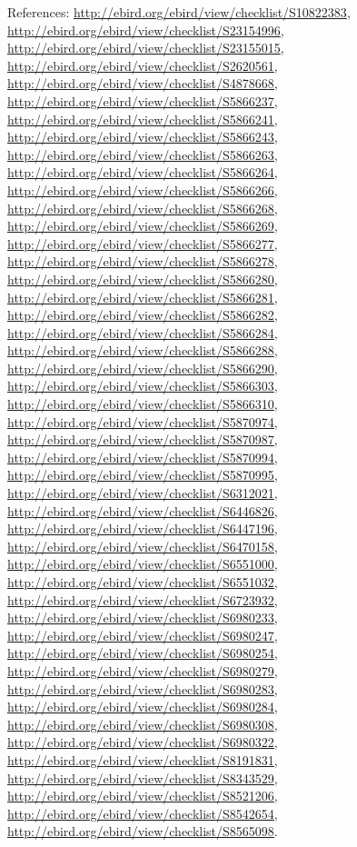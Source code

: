 \documentclass[9pt, article]{memoir}
\begin{document}
\begin{multicols}{2}
\vspace{6pt}References: 
\url{http://ebird.org/ebird/view/checklist/S10822383}, 
\url{http://ebird.org/ebird/view/checklist/S23154996}, 
\url{http://ebird.org/ebird/view/checklist/S23155015}, 
\url{http://ebird.org/ebird/view/checklist/S2620561}, 
\url{http://ebird.org/ebird/view/checklist/S4878668}, 
\url{http://ebird.org/ebird/view/checklist/S5866237}, 
\url{http://ebird.org/ebird/view/checklist/S5866241}, 
\url{http://ebird.org/ebird/view/checklist/S5866243}, 
\url{http://ebird.org/ebird/view/checklist/S5866263}, 
\url{http://ebird.org/ebird/view/checklist/S5866264}, 
\url{http://ebird.org/ebird/view/checklist/S5866266}, 
\url{http://ebird.org/ebird/view/checklist/S5866268}, 
\url{http://ebird.org/ebird/view/checklist/S5866269}, 
\url{http://ebird.org/ebird/view/checklist/S5866277}, 
\url{http://ebird.org/ebird/view/checklist/S5866278}, 
\url{http://ebird.org/ebird/view/checklist/S5866280}, 
\url{http://ebird.org/ebird/view/checklist/S5866281}, 
\url{http://ebird.org/ebird/view/checklist/S5866282}, 
\url{http://ebird.org/ebird/view/checklist/S5866284}, 
\url{http://ebird.org/ebird/view/checklist/S5866288}, 
\url{http://ebird.org/ebird/view/checklist/S5866290}, 
\url{http://ebird.org/ebird/view/checklist/S5866303}, 
\url{http://ebird.org/ebird/view/checklist/S5866310}, 
\url{http://ebird.org/ebird/view/checklist/S5870974}, 
\url{http://ebird.org/ebird/view/checklist/S5870987}, 
\url{http://ebird.org/ebird/view/checklist/S5870994}, 
\url{http://ebird.org/ebird/view/checklist/S5870995}, 
\url{http://ebird.org/ebird/view/checklist/S6312021}, 
\url{http://ebird.org/ebird/view/checklist/S6446826}, 
\url{http://ebird.org/ebird/view/checklist/S6447196}, 
\url{http://ebird.org/ebird/view/checklist/S6470158}, 
\url{http://ebird.org/ebird/view/checklist/S6551000}, 
\url{http://ebird.org/ebird/view/checklist/S6551032}, 
\url{http://ebird.org/ebird/view/checklist/S6723932}, 
\url{http://ebird.org/ebird/view/checklist/S6980233}, 
\url{http://ebird.org/ebird/view/checklist/S6980247}, 
\url{http://ebird.org/ebird/view/checklist/S6980254}, 
\url{http://ebird.org/ebird/view/checklist/S6980279}, 
\url{http://ebird.org/ebird/view/checklist/S6980283}, 
\url{http://ebird.org/ebird/view/checklist/S6980284}, 
\url{http://ebird.org/ebird/view/checklist/S6980308}, 
\url{http://ebird.org/ebird/view/checklist/S6980322}, 
\url{http://ebird.org/ebird/view/checklist/S8191831}, 
\url{http://ebird.org/ebird/view/checklist/S8343529}, 
\url{http://ebird.org/ebird/view/checklist/S8521206}, 
\url{http://ebird.org/ebird/view/checklist/S8542654}, 
\url{http://ebird.org/ebird/view/checklist/S8565098}.


\end{multicols}
\end{document}
